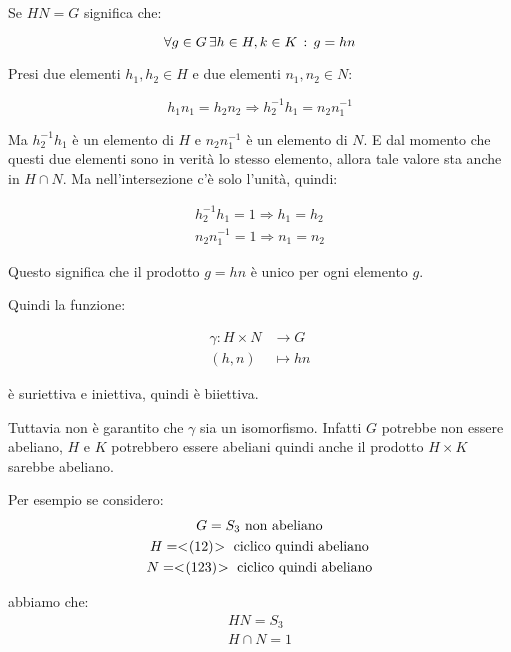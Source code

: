 \begin{soluzione}
	Se $HN = G$ significa che:
	
	\begin{equation*}
		\forall g \in G \, \exists h \in H, k \in K \,:\, g = hn
	\end{equation*}

	Presi due elementi $h_1, h_2 \in H$ e due elementi $n_1, n_2 \in N$:
	
	\begin{equation*}
		h_1n_1 = h_2n_2 \Longrightarrow h_2^{-1}h_1 = n_2n_1^{-1}
	\end{equation*}

	Ma $h_2^{-1}h_1$ è un elemento di $H$ e $n_2n_1^{-1}$ è un elemento di $N$. E dal momento che questi due elementi sono in verità lo stesso elemento, allora tale valore sta anche in $H \cap N$. Ma nell'intersezione c'è solo l'unità, quindi:
	
	\begin{gather*}
		h_2^{-1}h_1 = 1 \Longrightarrow h_1 = h_2 \\
		n_2 n_1^{-1} = 1 \Longrightarrow n_1 = n_2
	\end{gather*}

	Questo significa che il prodotto $g = hn$ è unico per ogni elemento $g$.
	
	Quindi la funzione:
	
	\begin{align}
		\gamma: H \times N &\longrightarrow G \\
		(h, n) &\longmapsto hn
	\end{align}

	è suriettiva e iniettiva, quindi è biiettiva.
	
	Tuttavia non è garantito che $\gamma$ sia un isomorfismo.
	Infatti $G$ potrebbe non essere abeliano, $H$ e $K$ potrebbero essere abeliani quindi anche il prodotto $H \times K$ sarebbe abeliano.
	
	Per esempio se considero:
	\begin{gather*}
		G = S_3 \text{ non abeliano} \\
		H = < \negmedspace (12) \negmedspace > \text{ ciclico quindi abeliano} \\
		N = < \negmedspace (123) \negmedspace > \text{ ciclico quindi abeliano}
	\end{gather*}

	abbiamo che:
	\begin{gather*}
		HN = S_3 \\
		H \cap N = 1
	\end{gather*}


\end{soluzione}
